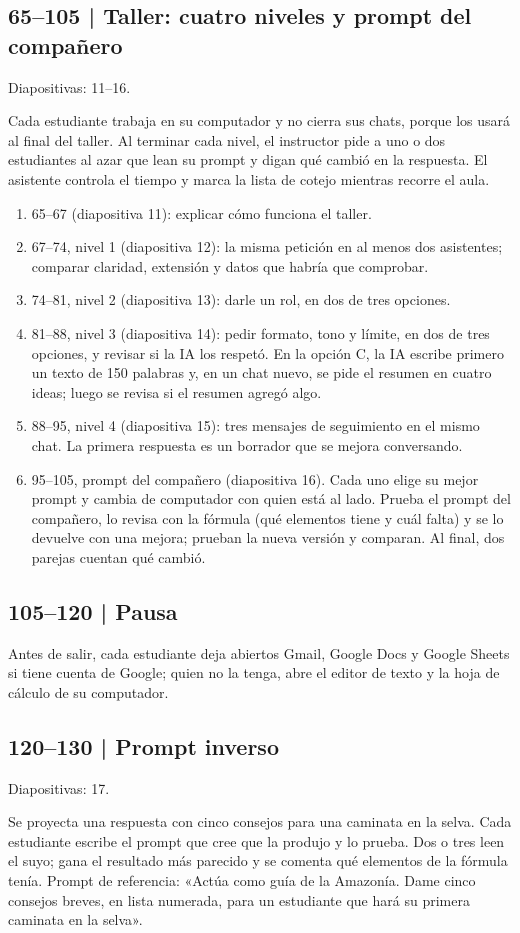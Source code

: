 \documentclass[11pt,a4paper]{article}
\newcommand{\diapos}[1]{\textcolor{gris}{\small\textsf{Diapositivas: #1}}\par}
\begin{document}
\subsection{65--105 | Taller: cuatro niveles y prompt del compañero}
\diapos{11--16.}
Cada estudiante trabaja en su computador y no cierra sus chats, porque los usará al final del taller. Al terminar cada nivel, el instructor pide a uno o dos estudiantes al azar que lean su prompt y digan qué cambió en la respuesta. El asistente controla el tiempo y marca la lista de cotejo mientras recorre el aula.
\begin{enumerate}
\item 65--67 (diapositiva 11): explicar cómo funciona el taller.
\item 67--74, nivel 1 (diapositiva 12): la misma petición en al menos dos asistentes; comparar claridad, extensión y datos que habría que comprobar.
\item 74--81, nivel 2 (diapositiva 13): darle un rol, en dos de tres opciones.
\item 81--88, nivel 3 (diapositiva 14): pedir formato, tono y límite, en dos de tres opciones, y revisar si la IA los respetó. En la opción C, la IA escribe primero un texto de 150 palabras y, en un chat nuevo, se pide el resumen en cuatro ideas; luego se revisa si el resumen agregó algo.
\item 88--95, nivel 4 (diapositiva 15): tres mensajes de seguimiento en el mismo chat. La primera respuesta es un borrador que se mejora conversando.
\item 95--105, prompt del compañero (diapositiva 16). Cada uno elige su mejor prompt y cambia de computador con quien está al lado. Prueba el prompt del compañero, lo revisa con la fórmula (qué elementos tiene y cuál falta) y se lo devuelve con una mejora; prueban la nueva versión y comparan. Al final, dos parejas cuentan qué cambió.
\end{enumerate}

\subsection{105--120 | Pausa}
Antes de salir, cada estudiante deja abiertos Gmail, Google Docs y Google Sheets si tiene cuenta de Google; quien no la tenga, abre el editor de texto y la hoja de cálculo de su computador.

\subsection{120--130 | Prompt inverso}
\diapos{17.}
Se proyecta una respuesta con cinco consejos para una caminata en la selva. Cada estudiante escribe el prompt que cree que la produjo y lo prueba. Dos o tres leen el suyo; gana el resultado más parecido y se comenta qué elementos de la fórmula tenía. Prompt de referencia: «Actúa como guía de la Amazonía. Dame cinco consejos breves, en lista numerada, para un estudiante que hará su primera caminata en la selva».
\end{document}
